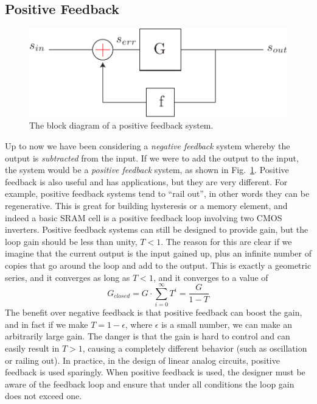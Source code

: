 \subsection{Positive Feedback}

\begin{figure}[tb]
\begin{center}
\includegraphics[scale=.7]{fbblock_posfb}
\end{center}
\caption{The block diagram of a positive feedback system.} \label{fig:fbblock_posfb}
\end{figure}

Up to now we have been considering a \textit{negative feedback} system whereby the output is \textit{subtracted} from the input. If we were to add the output to the input, the system would be a \textit{positive feedback} system, as shown in Fig.~\ref{fig:fbblock_posfb}.  Positive feedback is also useful and has applications, but they are very different.  For example, positive feedback systems tend to “rail out”, in other words they can be regenerative.  This is great for building hysteresis or a memory element, and indeed a basic SRAM cell is a positive feedback loop involving two CMOS inverters.  Positive feedback systems can still be designed to provide gain, but the loop gain should be less than unity, $T < 1$.  The reason for this are clear if we imagine that the current output is the input gained up, plus an infinite number of copies that go around the loop and add to the output.  This is exactly a geometric series, and it converges as long as $T< 1$, and it converges to a value of
\begin{equation}
	G_{closed} = G \cdot \sum_{i=0}^\infty T^i = \frac{G}{1 - T}
\end{equation}
%
The benefit over negative feedback is that positive feedback can boost the gain, and in fact if we make $T = 1 - \epsilon$, where $\epsilon$ is a small number, we can make an arbitrarily large gain.  The danger is that the gain is hard to control and can easily result in $T> 1$, causing a completely different behavior (such as oscillation or railing out).  In practice, in the design of linear analog circuits, positive feedback is used sparingly.  When positive feedback is used, the designer must be aware of the feedback loop and ensure that under all conditions the loop gain does not exceed one.


